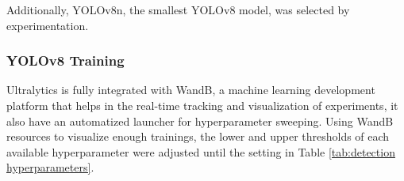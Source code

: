 {
    Additionally, \ac{YOLOv8n}, the smallest \ac{YOLOv8} model, was selected by experimentation.
}

\needspace{0.2\textheight}

\subsubsection{YOLOv8 Training}

{
    Ultralytics is fully integrated with \ac{WandB}\cite{wandb}, a machine learning development platform that helps in the real-time tracking and visualization of experiments, it also have an automatized launcher for hyperparameter sweeping. 
    Using \ac{WandB} resources to visualize enough trainings, the lower and upper thresholds of each available hyperparameter were adjusted until the setting in Table \ref{tab:detection hyperparameters}.
}

